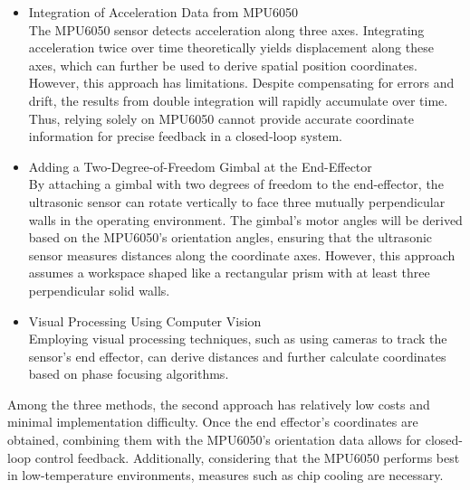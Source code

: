 \begin{itemize}
    \item Integration of Acceleration Data from MPU6050 \\
    The MPU6050 sensor detects acceleration along three axes. Integrating acceleration twice over time theoretically yields 
    displacement along these axes, which can further be used to derive spatial position coordinates. However, this approach 
    has limitations. Despite compensating for errors and drift, the results from double integration will rapidly accumulate 
    over time. Thus, relying solely on MPU6050 cannot provide accurate coordinate information for precise feedback in a 
    closed-loop system.
    \item Adding a Two-Degree-of-Freedom Gimbal at the End-Effector \\
    By attaching a gimbal with two degrees of freedom to the end-effector, the ultrasonic sensor can rotate vertically to face 
    three mutually perpendicular walls in the operating environment. The gimbal’s motor angles will be derived based on the 
    MPU6050’s orientation angles, ensuring that the ultrasonic sensor measures distances along the coordinate axes. However, 
    this approach assumes a workspace shaped like a rectangular prism with at least three perpendicular solid walls.
    \item Visual Processing Using Computer Vision \\
    Employing visual processing techniques, such as using cameras to track the sensor’s end effector, can derive distances 
    and further calculate coordinates based on phase focusing algorithms.
\end{itemize}
Among the three methods, the second approach has relatively low costs and minimal implementation difficulty. Once the 
end effector’s coordinates are obtained, combining them with the MPU6050’s orientation data allows for closed-loop control 
feedback. Additionally, considering that the MPU6050 performs best in low-temperature environments, measures such as 
chip cooling are necessary.

\newpage